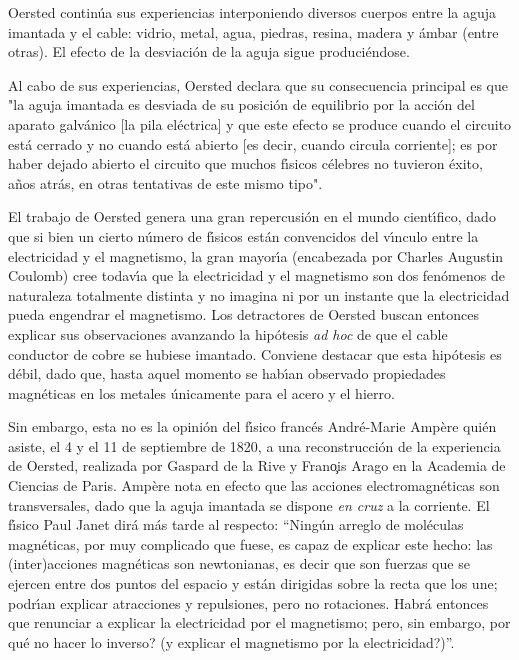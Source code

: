 \documentclass{article}
\begin{document}
Oersted contin\'ua sus experiencias interponiendo diversos cuerpos entre
la aguja imantada y el cable: vidrio, metal, agua, piedras, resina, madera
y \'ambar (entre otras). El efecto de la desviaci\'on de la aguja sigue
produci\'endose.  

Al cabo de sus experiencias, Oersted declara que su consecuencia principal es
que "la aguja imantada es desviada de su posici\'on de equilibrio por la 
acci\'on del aparato galv\'anico [la pila el\'ectrica] y que este efecto 
se produce cuando el circuito est\'a cerrado y no cuando est\'a abierto
[es decir, cuando circula corriente]; es por haber dejado abierto el circuito
que muchos f\'\i sicos c\'elebres no tuvieron \'exito, a\~nos atr\'as, en
otras tentativas de este mismo tipo".

El trabajo de Oersted genera una gran repercusi\'on en el mundo cient\'\i fico,
dado que si bien un cierto n\'umero de f\'\i sicos est\'an convencidos del 
v\'\i nculo entre la electricidad y el magnetismo, la gran mayor\'\i a
(encabezada por Charles Augustin Coulomb) cree todav\'\i a que la electricidad
y el magnetismo son dos fen\'omenos de naturaleza totalmente distinta y no
imagina ni por un instante que la electricidad pueda engendrar el magnetismo. 
Los detractores de Oersted buscan entonces explicar sus observaciones 
avanzando la hip\'otesis {\it ad hoc} de que el cable conductor de cobre se hubiese
imantado. Conviene destacar que esta hip\'otesis es d\'ebil, dado que, hasta aquel 
momento se hab\'\i an observado propiedades magn\'eticas en los metales
\'unicamente para el acero y el hierro.

Sin embargo, esta no es la opini\'on del f\'\i sico franc\'es Andr\'e-Marie
Amp\`ere qui\'en asiste, el 4 y el 11 de septiembre de 1820, a una
reconstrucci\'on de la experiencia de Oersted, realizada por Gaspard de la Rive
y Fran\c ois Arago en la Academia de Ciencias de Paris. Amp\`ere nota en efecto
que las acciones electromagn\'eticas son transversales, dado que la aguja
imantada se dispone {\it en cruz} a la corriente. El f\'\i sico Paul Janet
dir\'a m\'as tarde al respecto: ``Ning\'un arreglo de mol\'eculas magn\'eticas,
por muy complicado que fuese, es capaz de explicar este hecho: las (inter)acciones
magn\'eticas son newtonianas, es decir que son fuerzas que se ejercen entre dos
puntos del espacio y est\'an dirigidas sobre la recta que los une; podr\'\i an
explicar atracciones y repulsiones, pero no rotaciones. Habr\'a entonces que 
renunciar a explicar la electricidad por el magnetismo; pero, sin embargo, por
qu\'e no hacer lo inverso? (y explicar el magnetismo por la electricidad?)''.
\end{document}
